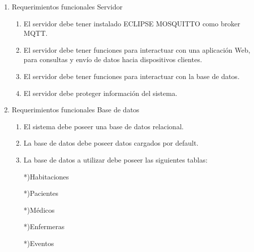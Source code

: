 \documentclass[
11pt, %
]{charter}
\begin{document}
\begin{enumerate}
	\item Requerimientos funcionales Servidor
			\begin{enumerate}
			\item El servidor debe tener instalado ECLIPSE MOSQUITTO como broker MQTT.
			\item El servidor debe tener funciones para interactuar con una aplicación Web, para consultas y envío de datos hacia dispositivos clientes.
			\item El servidor debe tener funciones para interactuar con la base de datos.
			\item El servidor debe proteger información del sistema.
			
			\end{enumerate}
	\item Requerimientos funcionales Base de datos
		\begin{enumerate}		
			\item El sistema debe poseer una base de datos relacional.
			\item La base de datos debe poseer datos cargados por default.
			\item La base de datos a utilizar debe poseer las siguientes tablas:
			
			*)Habitaciones
						
			*)Pacientes			
			
			*)Médicos
			
			*)Enfermeras			
			
			*)Eventos 


\end{enumerate}
\end{enumerate}
\end{document}
